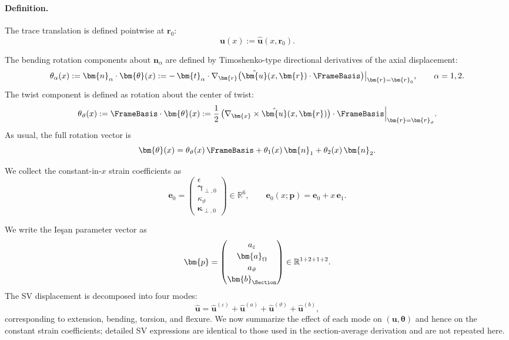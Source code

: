 \paragraph{Definition.}

The trace translation is defined pointwise at $\bm{r}_0$:
\begin{equation}
\bm{u}(x) := \hat{\bm{u}}(x,\bm{r}_0).
\label{eq:def-tim-trace-u}
\end{equation}

The bending rotation components about $\bm{n}_\alpha$ are defined by 
Timoshenko-type directional derivatives of the axial displacement:
\begin{equation}
\theta_\alpha(x)
:= \bm{n}_\alpha\cdot\bm{\theta}(x)
:= -\,\bm{t}_\alpha\cdot\nabla_{\bm{r}}
\big(\hat{\bm{u}}(x,\bm{r})\cdot\FrameBasis\big)\big|_{\bm{r}=\bm{r}_0},
\qquad \alpha=1,2.
\label{eq:def-tim-theta-bend}
\end{equation}
The twist component is defined as rotation about the center of twist:
\begin{equation}
\theta_\vartheta(x)
:= \FrameBasis\cdot\bm{\theta}(x)
:= \frac{1}{2}\,\big(\nabla_{\bm{x}}\times\hat{\bm{u}}(x,\bm{r})\big)
\cdot\FrameBasis\Big|_{\bm{r}=\bm{r}_\vartheta}.
\label{eq:def-tim-theta-twist}
\end{equation}
As usual, the full rotation vector is
\begin{equation}
\bm{\theta}(x)
=
\theta_\vartheta(x)\,\FrameBasis
+ \theta_1(x)\,\bm{n}_1 
+ \theta_2(x)\,\bm{n}_2.
\label{eq:def-tim-theta-vector}
\end{equation}

We collect the constant-in-$x$ strain coefficients as
\begin{equation}
\bm{e}_0
=
\begin{pmatrix}
\epsilon \\[2pt]
\bm{\gamma}_{\perp,0} \\[2pt]
\kappa_\vartheta \\[2pt]
\bm{\kappa}_{\perp,0}
\end{pmatrix}
\in\mathbb{R}^6,
\qquad
\bm{e}_0(x;\bm{p})
=
\bm{e}_0 + x\,\bm{e}_1.
\end{equation}


We write the Ieşan parameter vector as
\begin{equation}
\bm{p}
=
\begin{pmatrix}
a_\varepsilon \\[2pt]
\bm{a}_\Omega \\[2pt]
a_\vartheta \\[2pt]
\bm{b}_{\Section}
\end{pmatrix}
\in\mathbb{R}^{1+2+1+2}.
\end{equation}
The SV displacement is decomposed into four modes:
\[
\hat{\bm{u}}
=
\hat{\bm{u}}^{(\varepsilon)} 
+ \hat{\bm{u}}^{(a)} 
+ \hat{\bm{u}}^{(\vartheta)} 
+ \hat{\bm{u}}^{(b)},
\]
corresponding to extension, bending, torsion, and flexure. We now summarize 
the effect of each mode on $(\bm{u},\bm{\theta})$ and hence on the constant 
strain coefficients; detailed SV expressions are identical to those used in 
the section-average derivation and are not repeated here.

